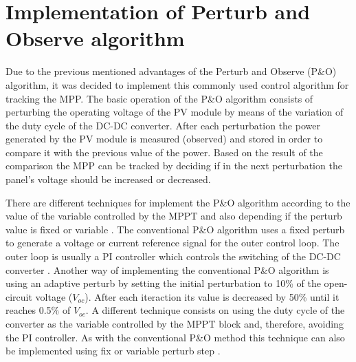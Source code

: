 \section{Implementation of Perturb and Observe algorithm}\label{MPPTImplementation}

Due to the previous mentioned advantages of the Perturb and Observe (P\&O)  algorithm, it was decided to implement this commonly used control algorithm for tracking the MPP. The basic operation of the P\&O algorithm consists of perturbing the operating voltage of the PV module by means of the variation of the duty cycle of the DC-DC converter. After each perturbation the power generated by the PV module is measured (observed) and stored in order to compare it with the previous value of the power. Based on the result of the comparison the MPP can be tracked by deciding if in the next perturbation the panel's voltage should be increased or decreased.

There are different techniques for implement the P\&O algorithm according to the value of the variable controlled by the MPPT and also depending if the perturb value is fixed or variable . The conventional P\&O algorithm uses a fixed perturb to generate a voltage or current reference signal for the outer control loop. The outer loop is usually a PI controller which controls the switching of the DC-DC converter . Another way of implementing the conventional P\&O algorithm is using an adaptive perturb by setting the initial perturbation to 10\% of the open-circuit voltage ($V_{oc}$). After each iteraction its value is decreased by 50\% until it reaches 0.5\%
of $V_{oc}$.  A different technique consists on using the duty cycle of the converter as the variable controlled by the MPPT block and, therefore, avoiding the PI controller. As with the conventional P\&O method this technique can also be implemented using fix or variable perturb step . 


